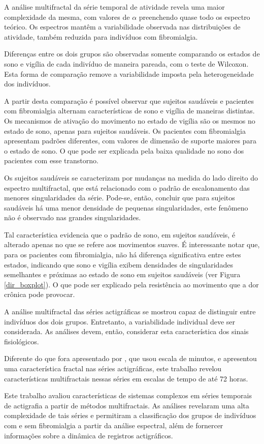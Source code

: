 \documentclass{ufscThesis}
\begin{document}
A análise multifractal da série temporal de atividade revela uma maior complexidade da mesma, com valores de $\alpha$ preenchendo quase todo os espectro teórico. Os espectros mantêm a variabilidade observada nas distribuições de atividade, também reduzida para indivíduos com fibromialgia.\par
Diferenças entre os dois grupos são observadas somente comparando os estados de sono e vigília de cada indivíduo de maneira pareada, com o teste de Wilcoxon. Esta forma de comparação remove a variabilidade imposta pela heterogeneidade dos indivíduos.\par
A partir desta comparação é possível observar que sujeitos saudáveis e pacientes com fibromialgia alternam características de sono e vigília de maneiras distintas. Os mecanismos de ativação do movimento no estado de vigília são os mesmos no estado de sono, apenas para sujeitos saudáveis. Os pacientes com fibromialgia apresentam padrões diferentes, com valores de dimensão de suporte maiores para o estado de sono. O que pode ser explicada pela baixa qualidade no sono dos pacientes com esse transtorno.\par
Os sujeitos saudáveis se caracterizam por mudanças na medida do lado direito do espectro multifractal, que está relacionado com o padrão de escalonamento das menores singularidades da série. Pode-se, então, concluir que para sujeitos saudáveis há uma menor densidade de pequenas singularidades, este fenômeno não é observado nas grandes singularidades.\par
Tal característica evidencia que o padrão de sono, em sujeitos saudáveis, é alterado apenas no que se refere aos movimentos suaves. É interessante notar que, para os pacientes com fibromialgia, não há diferença significativa entre estes estados, indicando que sono e vigília exibem densidades de singularidades semelhantes e próximas ao estado de sono em sujeitos saudáveis (ver Figura \ref{dir_boxplot}). O que pode ser explicado pela resistência ao movimento que a dor crônica pode provocar. \par 
A análise multifractal das séries actigráficas se mostrou capaz de distinguir entre indivíduos dos dois grupos. Entretanto, a variabilidade individual deve ser considerada. As análises devem, então, considerar esta característica dos sinais fisiológicos.\par
Diferente do que fora apresentado por , que usou escala de minutos, e apresentou uma característica fractal nas séries actigráficas, este trabalho revelou características multifractais nessas séries em escalas de tempo de até 72 horas.\par
Este trabalho avaliou características de sistemas complexos em séries temporais de actigrafia a partir de métodos multifractais. As análises revelaram uma alta complexidade de tais séries e permitiram a classificação dos grupos de indivíduos com e sem fibromialgia a partir da análise espectral, além de fornercer informações sobre a dinâmica de registros actigráficos.
\end{document}
